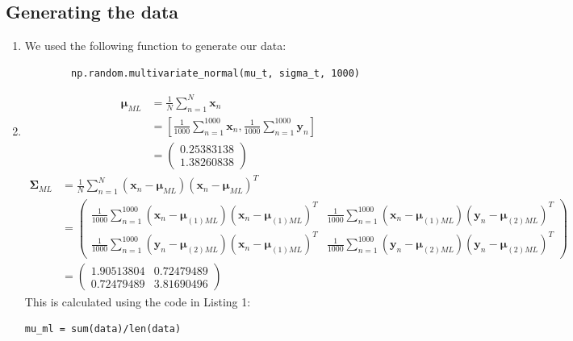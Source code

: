 \documentclass[a4paper,10pt]{article}
\numberwithin{equation}{section} %
\numberwithin{figure}{section} %
\numberwithin{table}{section} %
\theoremstyle{mytheor}
\begin{document}
\subsection{Generating the data}
\begin{enumerate}
	\item We used the following function to generate our data:
	\begin{verbatim}
		np.random.multivariate_normal(mu_t, sigma_t, 1000)
	\end{verbatim}
	\item \begin{align}\boldsymbol{\mu}_{ML} &= \frac{1}{N}  \sum_{n=1}^{N} \boldsymbol{x}_n \tag{Bishop 2.121}\\ 
	&= [\frac{1}{1000}  \sum_{n=1}^{1000} \boldsymbol{x}_n, \frac{1}{1000}  \sum_{n=1}^{1000} \boldsymbol{y}_n]\\
	&= \begin{pmatrix}
0.25383138\\
1.38260838
\end{pmatrix}
		\end{align}
		\begin{align}
		\boldsymbol{\Sigma}_{ML} &= \frac{1}{N} \sum_{n=1}^{N} (\boldsymbol{x}_n - \boldsymbol{\mu}_{ML})(\boldsymbol{x}_n - \boldsymbol{\mu}_{ML})^T \tag{Bishop 1.22}\\
		&= \begin{pmatrix}
\frac{1}{1000} \sum_{n=1}^{1000} (\boldsymbol{x}_n - \boldsymbol{\mu}_{(1)ML})(\boldsymbol{x}_n - \boldsymbol{\mu}_{(1)ML})^T & \frac{1}{1000} \sum_{n=1}^{1000} (\boldsymbol{x}_n - \boldsymbol{\mu}_{(1)ML})(\boldsymbol{y}_n - \boldsymbol{\mu}_{(2)ML})^T\\
\frac{1}{1000} \sum_{n=1}^{1000} (\boldsymbol{y}_n - \boldsymbol{\mu}_{(2)ML})(\boldsymbol{x}_n - \boldsymbol{\mu}_{(1)ML})^T & \frac{1}{1000} \sum_{n=1}^{1000} (\boldsymbol{y}_n - \boldsymbol{\mu}_{(2)ML})(\boldsymbol{y}_n - \boldsymbol{\mu}_{(2)ML})^T
\end{pmatrix}\\
		&= \begin{pmatrix}
1.90513804 & 0.72479489\\
0.72479489 & 3.81690496
\end{pmatrix}
		\end{align}
		This is calculated using the code in Listing 1:
		\begin{lstlisting}[label={list:first},caption=Python code to calculate $\boldsymbol \mu_{ML}$ and $\boldsymbol \Sigma_{ML}$.]
mu_ml = sum(data)/len(data)


\end{lstlisting}
\end{enumerate}
\end{document}

